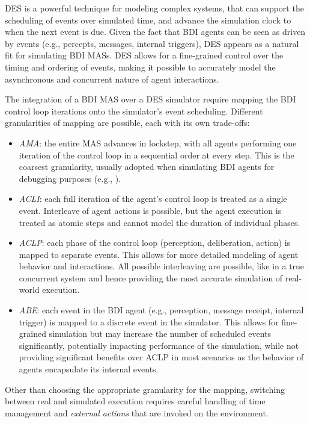 \ac{DES} is a powerful technique for modeling complex systems, that can support the scheduling of events over simulated time, and advance the simulation clock to when the next event is due.
%
Given the fact that \ac{BDI} agents can be seen as driven by events (e.g., percepts, messages, internal triggers), \ac{DES} appears as a natural fit for simulating \ac{BDI} \acp{MAS}. 
%
\ac{DES} allows for a fine-grained control over the timing and ordering of events, making it possible to accurately model the asynchronous and concurrent nature of agent interactions.

The integration of a \ac{BDI} \ac{MAS} over a \ac{DES} simulator require mapping the \ac{BDI} control loop iterations onto the simulator's event scheduling.
%
Different granularities of mapping are possible, each with its own trade-offs:
\begin{itemize}
\item \emph{\ac{AMA}}: the entire \ac{MAS} advances in lockstep, with all agents performing one iteration of the control loop in a sequential order at every step. This is the coarsest granularity, usually adopted when simulating \ac{BDI} agents for debugging purposes (e.g., \cite{HubnerB09}).
\item \emph{\ac{ACLI}}: each full iteration of the agent's control loop is treated as a single event. Interleave of agent actions is possible, but the agent execution is treated as atomic steps and cannot model the duration of individual phases.
\item \emph{\ac{ACLP}}: each phase of the control loop (perception, deliberation, action) is mapped to separate events. This allows for more detailed modeling of agent behavior and interactions. All possible interleaving are possible, like in a true concurrent system and hence providing the most accurate simulation of real-world execution.
\item \emph{\ac{ABE}}: each event in the \ac{BDI} agent (e.g., perception, message receipt, internal trigger) is mapped to a discrete event in the simulator. This allows for fine-grained simulation but may increase the number of scheduled events significantly, potentially impacting performance of the simulation, while not providing significant benefits over \ac{ACLP} in most scenarios as the behavior of agents encapsulate its internal events.
\end{itemize}

Other than choosing the appropriate granularity for the mapping, switching between real and simulated execution requires careful handling of time management and \emph{external actions} that are invoked on the environment.

